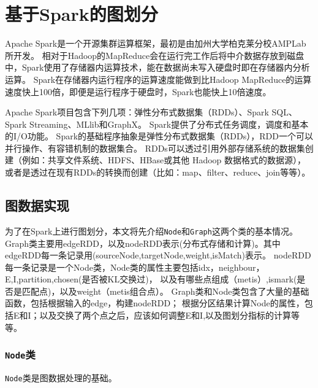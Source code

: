 \section{基于Spark的图划分}

Apache Spark是一个开源集群运算框架，最初是由加州大学柏克莱分校AMPLab所开发。
相对于Hadoop的MapReduce会在运行完工作后将中介数据存放到磁盘中，Spark使用了存储器内运算技术，能在数据尚未写入硬盘时即在存储器内分析运算。
Spark在存储器内运行程序的运算速度能做到比Hadoop MapReduce的运算速度快上100倍，即便是运行程序于硬盘时，Spark也能快上10倍速度。

Apache Spark项目包含下列几项：弹性分布式数据集（RDDs）、Spark SQL、Spark Streaming、MLlib和GraphX。
Spark提供了分布式任务调度，调度和基本的I/O功能。
Spark的基础程序抽象是弹性分布式数据集（RDDs），RDD一个可以并行操作、有容错机制的数据集合。
RDDs可以透过引用外部存储系统的数据集创建（例如：共享文件系统、HDFS、HBase或其他 Hadoop 数据格式的数据源），
或者是透过在现有RDDs的转换而创建（比如：map、filter、reduce、join等等）。 

\subsection{图数据实现}

为了在Spark上进行图划分，本文将先介绍\texttt{Node}和\texttt{Graph}这两个类的基本情况。Graph类主要用edgeRDD，以及nodeRDD表示(分布式存储和计算)。其中edgeRDD每一条记录用(sourceNode,targetNode,weight,isMatch)表示。
nodeRDD每一条记录是一个Node类，Node类的属性主要包括idx，neighbour，E,I,partition,chosen(是否被KL交换过)，
以及有哪些点组成（metis）,ismark(是否是匹配点)，以及weight（metis组合点）。
Graph类和Node类包含了大量的基础函数，包括根据输入的edge，构建nodeRDD；
根据分区结果计算Node的属性，包括E和I；以及交换了两个点之后，应该如何调整E和I,以及图划分指标的计算等等。

\subsubsection{\texttt{Node}类}

\texttt{Node}类是图数据处理的基础。

